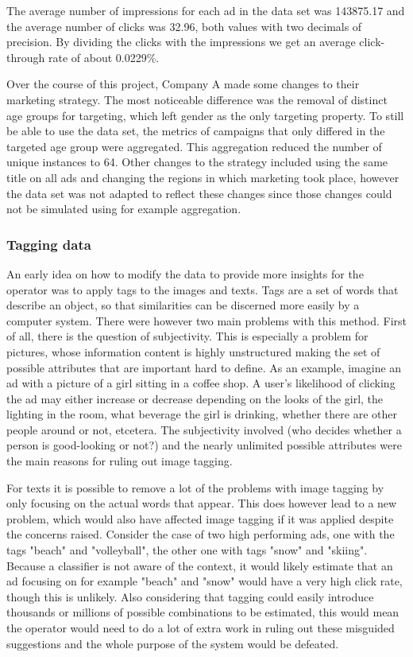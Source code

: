 \documentclass{sig-alternate}
\begin{document}
The average number of impressions for each ad in the data set was 143875.17 and the average number of clicks was 32.96, both values with two decimals of precision. By dividing the clicks with the impressions we get an average click-through rate of about 0.0229\%.

Over the course of this project, Company A made some changes to their marketing strategy. The most noticeable difference was the removal of distinct age groups for targeting, which left gender as the only targeting property. To still be able to use the data set, the metrics of campaigns that only differed in the targeted age group were aggregated. This aggregation reduced the number of unique instances to 64. Other changes to the strategy included using the same title on all ads and changing the regions in which marketing took place, however the data set was not adapted to reflect these changes since those changes could not be simulated using for example aggregation.

\subsubsection{Tagging data}
An early idea on how to modify the data to provide more insights for the operator was to apply tags to the images and texts. Tags are a set of words that describe an object, so that similarities can be discerned more easily by a computer system. There were however two main problems with this method. First of all, there is the question of subjectivity. This is especially a problem for pictures, whose information content is highly unstructured making the set of possible attributes that are important hard to define. As an example, imagine an ad with a picture of a girl sitting in a coffee shop. A user's likelihood of clicking the ad may either increase or decrease depending on the looks of the girl, the lighting in the room, what beverage the girl is drinking, whether there are other people around or not, etcetera. The subjectivity involved (who decides whether a person is good-looking or not?) and the nearly unlimited possible attributes were the main reasons for ruling out image tagging.

For texts it is possible to remove a lot of the problems with image tagging by only focusing on the actual words that appear. This does however lead to a new problem, which would also have affected image tagging if it was applied despite the concerns raised. Consider the case of two high performing ads, one with the tags "beach" and "volleyball", the other one with tags "snow" and "skiing". Because a classifier is not aware of the context, it would likely estimate that an ad focusing on for example "beach" and "snow" would have a very high click rate, though this is unlikely. Also considering that tagging could easily introduce thousands or millions of possible combinations to be estimated, this would mean the operator would need to do a lot of extra work in ruling out these misguided suggestions and the whole purpose of the system would be defeated.
\end{document}
